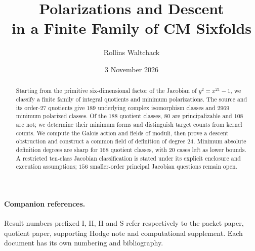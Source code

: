 \documentclass[11pt]{article}
\title{Polarizations and Descent\\in a Finite Family of CM Sixfolds}
\author{Rollins Waltchack}
\date{3 November 2026}
\begin{document}
\maketitle
\begin{abstract}
Starting from the primitive six-dimensional factor of the Jacobian
of $y^2=x^{21}-1$, we classify a finite family of integral quotients and
minimum polarizations. The source and its order-$27$ quotients give $189$
underlying complex isomorphism classes and $2969$ minimum polarized
classes. Of the $188$ quotient classes, $80$ are principalizable and $108$
are not; we determine their minimum forms and distinguish target counts
from kernel counts. We compute the Galois action and fields of moduli,
then prove a descent obstruction and construct a common field of
definition of degree $24$. Minimum absolute definition degrees are sharp
for $168$ quotient classes, with $20$ cases left as lower bounds.
A restricted ten-class Jacobian classification is stated under its
explicit enclosure and execution assumptions; $156$ smaller-order
principal Jacobian questions remain open.
\end{abstract}
\paragraph{Companion references.}
Result numbers prefixed I, II, H and S refer respectively to the packet
paper, quotient paper, supporting Hodge note and computational supplement.
Each document has its own numbering and bibliography.
{\small\tableofcontents}
\clearpage





\begingroup\small

\endgroup
\end{document}
